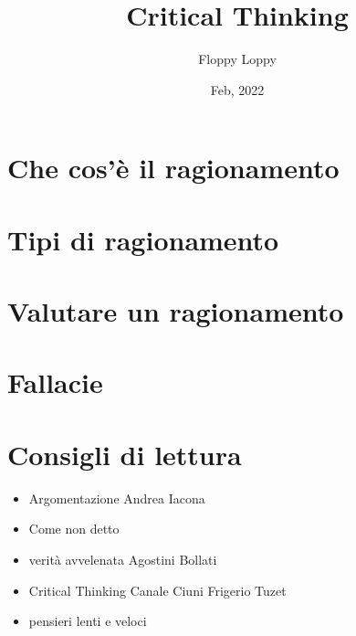 \documentclass[letterpaper 12pt]{article}
\theoremstyle{definition}
\begin{document}
\title{Critical Thinking}
\author{Floppy Loppy}
\date{Feb, 2022}
\maketitle
\tableofcontents
\newpage




\section{Che cos'è il ragionamento}



\newpage
\section{Tipi di ragionamento}



\newpage
\section{Valutare un ragionamento}



\newpage
\section{Fallacie}\label{sec:fallacie}



\newpage
\section{Consigli di lettura}
\begin{itemize}
        \item Argomentazione Andrea Iacona
        \item Come non detto 
        \item verità avvelenata Agostini Bollati
        \item Critical Thinking Canale Ciuni Frigerio Tuzet
        \item pensieri lenti e veloci
\end{itemize}
\end{document}
